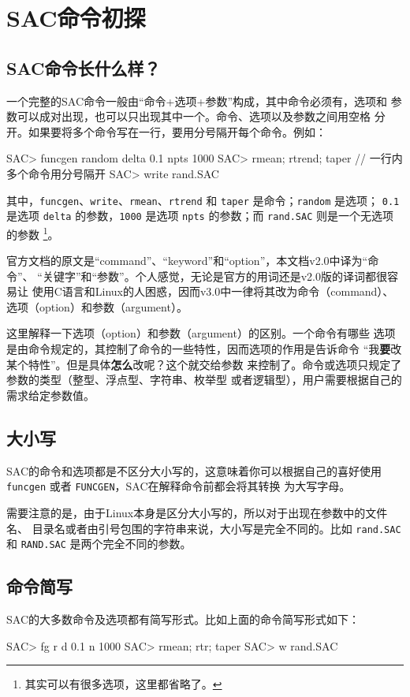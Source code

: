 \section{SAC命令初探}
\subsection{SAC命令长什么样？}
一个完整的SAC命令一般由``命令+选项+参数''构成，其中命令必须有，选项和
参数可以成对出现，也可以只出现其中一个。命令、选项以及参数之间用空格
分开。如果要将多个命令写在一行，要用分号隔开每个命令。例如：
\begin{SACCode}
SAC> funcgen random delta 0.1 npts 1000
SAC> rmean; rtrend; taper                 // 一行内多个命令用分号隔开
SAC> write rand.SAC
\end{SACCode}
其中，\texttt{funcgen}、\texttt{write}、\texttt{rmean}、\texttt{rtrend}
和 \texttt{taper} 是命令；\texttt{random} 是选项；
\texttt{0.1} 是选项 \texttt{delta} 的参数，\texttt{1000} 是选项
\texttt{npts} 的参数；而 \texttt{rand.SAC} 则是一个无选项的参数
\footnote{其实可以有很多选项，这里都省略了。}。

\begin{note}
官方文档的原文是“command”、“keyword”和“option”，本文档v2.0中译为“命令”、
“关键字”和“参数”。个人感觉，无论是官方的用词还是v2.0版的译词都很容易让
使用C语言和Linux的人困惑，因而v3.0中一律将其改为命令（command）、
选项（option）和参数（argument）。

这里解释一下选项（option）和参数（argument）的区别。一个命令有哪些
选项是由命令规定的，其控制了命令的一些特性，因而选项的作用是告诉命令
“我\textbf{要}改某个特性”。但是具体\textbf{怎么}改呢？这个就交给参数
来控制了。命令或选项只规定了参数的类型（整型、浮点型、字符串、枚举型
或者逻辑型），用户需要根据自己的需求给定参数值。
\end{note}

\subsection{大小写}
SAC的命令和选项都是不区分大小写的，这意味着你可以根据自己的喜好使用
\texttt{funcgen} 或者 \texttt{FUNCGEN}，SAC在解释命令前都会将其转换
为大写字母。

需要注意的是，由于Linux本身是区分大小写的，所以对于出现在参数中的文件名、
目录名或者由引号包围的字符串来说，大小写是完全不同的。比如 \texttt{rand.SAC}
和 \texttt{RAND.SAC} 是两个完全不同的参数。

\subsection{命令简写}
SAC的大多数命令及选项都有简写形式。比如上面的命令简写形式如下：
\begin{SACCode}
SAC> fg r d 0.1 n 1000
SAC> rmean; rtr; taper
SAC> w rand.SAC
\end{SACCode}

